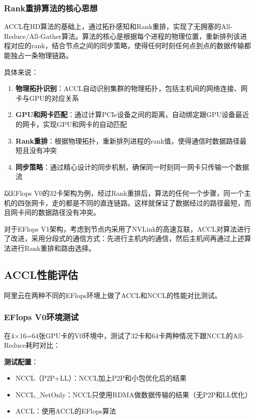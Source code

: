 \subsubsection{Rank重排算法的核心思想}

ACCL在HD算法的基础上，通过拓扑感知和Rank重排，实现了无拥塞的All-Reduce/All-Gather算法。算法的核心是根据每个进程的物理位置，重新排列该进程对应的rank，结合节点之间的同步策略，使得任何时刻任何点到点的数据传输都能独占一条物理链路。

具体来说：
\begin{enumerate}
    \item \textbf{物理拓扑识别}：ACCL自动识别集群的物理拓扑，包括主机间的网络连接、网卡与GPU的对应关系
    \item \textbf{GPU和网卡匹配}：通过计算PCIe设备之间的距离，自动绑定跟GPU设备最近的网卡，实现GPU和网卡的自动匹配
    \item \textbf{Rank重排}：根据物理拓扑，重新排列进程的rank值，使得通信时数据路径最短且没有冲突
    \item \textbf{同步策略}：通过精心设计的同步机制，确保同一时刻同一网卡只传输一个数据流
\end{enumerate}

以EFlops V0的32卡架构为例，经过Rank重排后，算法的任何一个步骤，同一个主机的四张网卡，走的都是不同的直连链路。这样就保证了数据经过的路径最短，而且网卡间的数据路径没有冲突。

对于EFlops V1架构，考虑到节点内采用了NVLink的高速互联，ACCL对算法进行了改进，采用分段式的通信方式：先进行主机内的通信，然后主机间再通过上述算法进行Rank重排和路由选择。

\subsection{ACCL性能评估}

阿里云在两种不同的EFlops环境上做了ACCL和NCCL的性能对比测试。

\subsubsection{EFlops V0环境测试}

在4×16=64张GPU卡的V0环境中，测试了32卡和64卡两种情况下跟NCCL的All-Reduce耗时对比：

\textbf{测试配置}：
\begin{itemize}
    \item NCCL（P2P+LL）：NCCL加上P2P和小包优化后的结果
    \item NCCL\_NetOnly：NCCL只使用RDMA做数据传输的结果（无P2P和LL优化）
    \item ACCL：使用ACCL的EFlops算法
\end{itemize}

